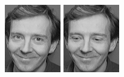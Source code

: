 \begin{figure}[ht]
 \includegraphics[width=\columnwidth/11]{ch3/figures/s3_7.png}
 \includegraphics[width=\columnwidth/11]{ch3/figures/s3_8.png}

\end{figure}
